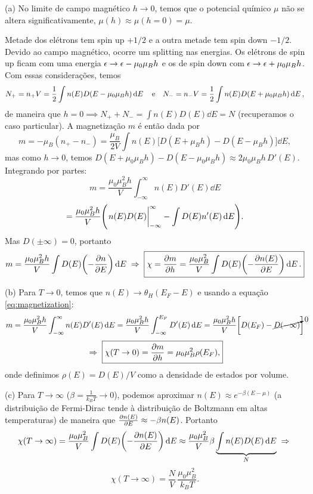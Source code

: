 \documentclass[a4paper,10pt]{article}
\begin{document}
(a) No limite de campo magnético $h \to 0$, temos que o potencial químico $\mu$ não se altera significativamente, $\mu(h) \approx \mu(h = 0) = \mu$.

Metade dos elétrons tem spin up $+1/2$ e a outra metade tem spin down $-1/2$. Devido ao campo magnético, ocorre um splitting nas energias. Os elétrons de spin up ficam com uma energia $\epsilon \to \epsilon - \mu_0 \mu_B h$ e os de spin down com $\epsilon \to \epsilon + \mu_0 \mu_B h$. Com essas considerações, temos
$$
N_+ = n_+ V = \frac{1}{2} \int n(E) D(E - \mu_0 \mu_B h) \dd{E} \quad \mathrm{e} \quad
N_- = n_- V = \frac{1}{2} \int n(E) D(E + \mu_0 \mu_B h) \dd{E},
$$
de maneira que $h = 0 \implies N_+ + N_- = \int n(E) D(E) \dd{E} = N$ (recuperamos o caso particular). A magnetização $m$ é então dada por
$$
m = - \mu_B (n_+ - n_-) =
\frac{\mu_B}{2V} \int n(E) \Big[ D(E + \mu_B h) - D(E - \mu_B h) \Big] \dd{E},
$$
mas como $h \to 0$, temos $D(E + \mu_0 \mu_B h) - D(E - \mu_0 \mu_B h) \approx 2 \mu_0 \mu_B h \, D'(E)$. Integrando por partes:
\begin{equation} \label{eq:magnetization}
m = \frac{\mu_0 \mu_B^2 h}{V} \int_{-\infty}^{\infty} n(E) D'(E) \dd{E}
\end{equation}
$$
= \frac{\mu_0 \mu_B^2 h}{V} \qty(\eval{n(E) D(E)}_{-\infty}^{\infty} - \int D(E) n'(E) \dd{E} ).
$$
Mas $D(\pm\infty) = 0$, portanto
$$
m = \frac{\mu_0 \mu_B^2 h}{V} \int D(E) \qty(- \pdv{n}{E}) \dd{E} \; \Rightarrow \;
\boxed{ \chi = \pdv{m}{h} = \frac{\mu_0 \mu_B^2}{V} \int D(E) \qty(- \pdv{n(E)}{E}) \dd{E}. }
$$

\n\n

(b) Para $T \to 0$, temos que $n(E) \to \theta_H(E_F-E)$ e usando a equação \ref{eq:magnetization}:
$$
m = \frac{\mu_0 \mu_B^2 h}{V} \int_{-\infty}^{\infty} n(E) D'(E) \dd{E} =
\frac{\mu_0 \mu_B^2 h}{V} \int_{-\infty}^{E_F} D'(E) \dd{E} =
\frac{\mu_0 \mu_B^2 h}{V} \qty[ D(E_F) - \cancelto{0}{D(-\infty)} ]
$$
$$
\; \Rightarrow \; \boxed{ \chi(T\to 0) = \pdv{m}{h} = \mu_0 \mu_B^2 \rho(E_F), }
$$
onde definimos $\rho(E) = D(E) / V$ como a densidade de estados por volume.

\n\n

(c) Para $T \to \infty$ ($\beta = \frac{1}{k_B T} \to 0$), podemos aproximar $n(E) \approx e^{-\beta(E - \mu)}$ (a distribuição de Fermi-Dirac tende à distribuição de Boltzmann em altas temperaturas) de maneira que $\pdv{n(E)}{E} \approx -\beta n(E)$. Portanto
$$
\chi(T \to \infty) = \frac{\mu_0\mu_B^2}{V} \int D(E) \qty(- \pdv{n(E)}{E}) \dd{E} \approx
\frac{\mu_0\mu_B^2}{V} \beta \underbrace{\int n(E) D(E) \dd{E}}_{N} \; \Rightarrow \;
$$
$$
\boxed{ \chi(T\to\infty) = \frac{N}{V} \, \frac{\mu_0 \mu_B^2}{k_B T}. }
$$
\end{document}
